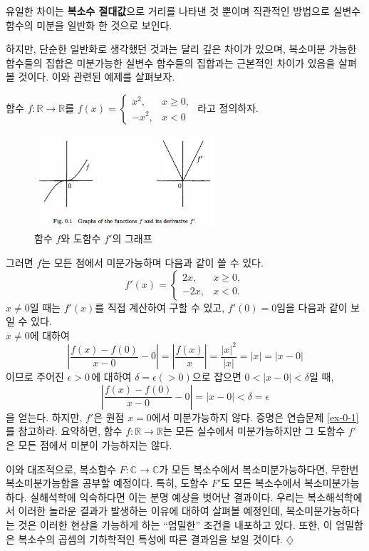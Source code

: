 유일한 차이는 {\bf 복소수 절대값}으로 거리를 나타낸 것 뿐이며
직관적인 방법으로 
실변수 함수의 미분을 일반화 한 것으로 보인다.

하지만, 단순한 일반화로 생각했던 것과는 달리 깊은 차이가 있으며,
복소미분 가능한 함수들의 집합은  미분가능한 실변수 함수들의 집합과는 근본적인 차이가 있음을 살펴볼 것이다.
이와 관련된 예제를 살펴보자.

\begin{salt_example} \label{example-0-1}
함수 $f:\mathbb R \to \mathbb R$를
$ f(x) = \begin{cases} x^2, & x\ge 0, \\ -x^2, & x<0 \end{cases}$
라고 정의하자.

\begin{figure}[!h]
\begin{center}
\includegraphics[width=0.6\textwidth]{./SaltChapter/preface-fig-0-1}
\end{center}
\label{fig:0.1}
\caption{함수 $f$와 도함수 $f'$의 그래프}
\end{figure}

그러면 $f$는 모든 점에서 미분가능하며 다음과 같이 쓸 수 있다.
\begin{equation}\label{eq0.1}
f'(x) = \begin{cases} 2x, & x\ge 0, \\ -2x, & x<0. \end{cases}
\end{equation}
$x\ne0$일 때는 $f'(x)$를 직접 계산하여 구할 수 있고,
$f'(0)=0$임을 다음과 같이 보일 수 있다. \\
$x\ne0$에 대하여
$$
\left| \frac{f(x) - f(0)}{x-0} - 0\right|  = \left| \frac{f(x)}{x}\right| = \frac{|x|^2}{|x|} = |x| = |x-0|
$$
이므로 주어진 $\epsilon>0\,$에 대하여 
$\delta = \epsilon (>0)$으로 잡으면
$0<|x-0|<\delta$일 때, 
$$
\left| \frac{f(x) - f(0)}{x-0} - 0\right|  = |x-0| <\delta = \epsilon
$$
을 얻는다.
하지만, $f'$은 원점 $x=0$에서 미분가능하지 않다.
증명은 연습문제 \ref{ex-0-1}를 참고하라.
요약하면, 함수 $f:\mathbb R \to \mathbb R$는 모든 실수에서 미분가능하지만 
그 도함수 $f'$은 모든 점에서 미분이 가능하지는 않다.

이와 대조적으로, 복소함수 $F:\mathbb C \to \mathbb C$가
모든 복소수에서 복소미분가능하다면, 무한번 복소미분가능함을 공부할 예정이다.
특히, 도함수 $F'$도 모든 복소수에서 복소미분가능하다.
실해석학에 익숙하다면 이는 분명 예상을 벗어난 결과이다.
우리는 복소해석학에서 이러한 놀라운 결과가 발생하는 이유에 대하여 살펴볼 예정인데,
복소미분가능하다는 것은 이러한 현상을 가능하게 하는 ``엄밀한'' 조건을 내포하고 있다.
또한, 이 엄밀함은 복소수의 곱셈의 기하학적인 특성에 따른 결과임을 보일 것이다.
\hfill $\diamondsuit$
\end{salt_example}

